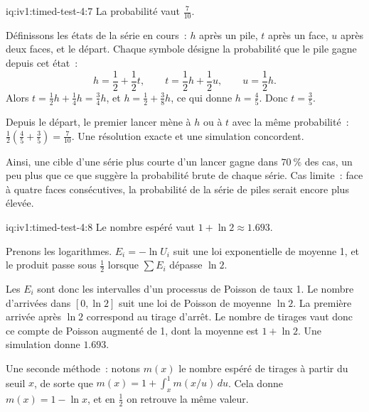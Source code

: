 \begin{solution}{iq:iv1:timed-test-4:7}
La probabilité vaut $\frac{7}{10}$.

Définissons les états de la série en cours~: $h$ après un pile, $t$ après un face, $u$ après deux faces, et le départ. Chaque symbole désigne la probabilité que le pile gagne depuis cet état~:
\[
h = \frac12 + \frac12t, \qquad t = \frac12h + \frac12u, \qquad u = \frac12h.
\]
Alors $t = \frac12h + \frac14h = \frac34h$, et $h = \frac12 + \frac38h$, ce qui donne $h = \frac45$. Donc $t = \frac35$.

Depuis le départ, le premier lancer mène à $h$ ou à $t$ avec la même probabilité~: $\frac12(\frac45 + \frac35) = \frac{7}{10}$. Une résolution exacte et une simulation concordent.

Ainsi, une cible d'une série plus courte d'un lancer gagne dans $70~\%$ des cas, un peu plus que ce que suggère la probabilité brute de chaque série. Cas limite~: face à quatre faces consécutives, la probabilité de la série de piles serait encore plus élevée.

\end{solution}

\begin{solution}{iq:iv1:timed-test-4:8}
Le nombre espéré vaut $1 + \ln 2 \approx 1.693$.

Prenons les logarithmes. $E_i = -\ln U_i$ suit une loi exponentielle de moyenne 1, et le produit passe sous $\frac12$ lorsque $\sum E_i$ dépasse $\ln 2$.

Les $E_i$ sont donc les intervalles d'un processus de Poisson de taux 1. Le nombre d'arrivées dans $[0, \ln 2]$ suit une loi de Poisson de moyenne $\ln 2$. La première arrivée après $\ln 2$ correspond au tirage d'arrêt. Le nombre de tirages vaut donc ce compte de Poisson augmenté de 1, dont la moyenne est $1 + \ln 2$. Une simulation donne $1.693$.

Une seconde méthode~: notons $m(x)$ le nombre espéré de tirages à partir du seuil $x$, de sorte que $m(x) = 1 + \int_x^1m(x/u)\,du$. Cela donne $m(x) = 1 - \ln x$, et en $\frac12$ on retrouve la même valeur.


\end{solution}

